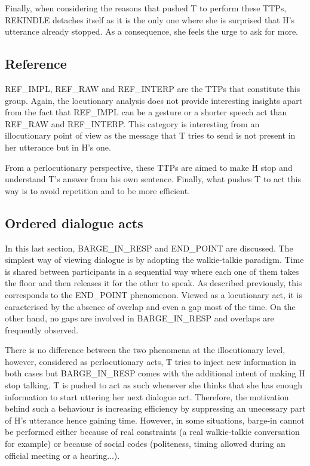 					Finally, when considering the reasons that pushed T to perform these TTPs, REKINDLE detaches itself as it is the only one where she is surprised that H's utterance already stopped. As a consequence, she feels the urge to ask for more.

    \subsection{Reference}
		
					REF\_IMPL, REF\_RAW and REF\_INTERP are the TTPs that constitute this group. Again, the locutionary analysis does not provide interesting insights apart from the fact that REF\_IMPL can be a gesture or a shorter speech act than REF\_RAW and REF\_INTERP. This category is interesting from an illocutionary point of view as the message that T tries to send is not present in her utterance but in H's one.
					
					From a perlocutionary perspective, these TTPs are aimed to make H stop and understand T's answer from his own sentence. Finally, what pushes T to act this way is to avoid repetition and to be more efficient.

    \subsection{Ordered dialogue acts}

         In this last section, BARGE\_IN\_RESP and END\_POINT are discussed. The simplest way of viewing dialogue is by adopting the walkie-talkie paradigm. Time is shared between participants in a sequential way where each one of them takes the floor and then releases it for the other to speak. As described previously, this corresponds to the END\_POINT phenomenon. Viewed as a locutionary act, it is caracterised by the absence of overlap and even a gap most of the time. On the other hand, no gaps are involved in BARGE\_IN\_RESP and overlaps are frequently observed.

         There is no difference between the two phenomena at the illocutionary level, however, considered as perlocutionary acts, T tries to inject new information in both cases but BARGE\_IN\_RESP comes with the additional intent of making H stop talking. T is pushed to act as such whenever she thinks that she has enough information to start uttering her next dialogue act. Therefore, the motivation behind such a behaviour is increasing efficiency by suppressing an unecessary part of H's utterance hence gaining time. However, in some situations, barge-in cannot be performed either because of real constraints (a real walkie-talkie conversation for example) or because of social codes (politeness, timing allowed during an official meeting or a hearing...).
				
